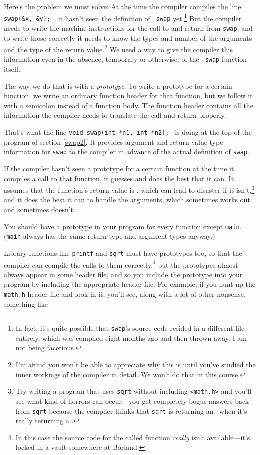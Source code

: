 Here's the problem we must solve: At the time the compiler compiles the
line {\tt swap(\&x, \&y); }, it hasn't seen the definition of {\tt
swap} yet.\footnote{In fact, it's quite possible that {\tt swap}'s
source code resided in a different file entirely, which was compiled
eight months ago and then thrown away.  I am not being facetious.} But
the compiler needs to write the machine instructions for the call to and
return from {\tt swap}, and to write those correctly it needs to know
the types and number of the arguments and the type of the return
value.\footnote{I'm afraid you won't be able to appreciate why this is
until you've studied the inner workings of the compiler in detail.  We
won't do that in this course.} We need a way to give the compiler this
information even in the absence, temporary or otherwise, of the {\tt
swap} function itself.

The way we do that is with a {\em prototype}\/.  To write a prototype
for a certain function, we write an ordinary function header for that
function, but we follow it with a semicolon instead of a function body.
The function header contains all the information the compiler needs to
translate the call and return properly.

That's what the line {\tt void swap(int *n1, int *n2); } is doing at the
top of the program of section \ref{swap2}.  It provides argument and
return value type information for {\tt swap} to the compiler in
advance of the actual definition of {\tt swap}.

If the compiler hasn't seen a prototype for a certain function at the
time it compiles a call to that function, it guesses and does the best
that it can.  It assumes that the function's return value is \int, which
can lead to disaster if it isn't,\footnote{Try writing a program that
uses {\tt sqrt} without including {\tt <math.h>} and you'll see what
kind of horrors can occur---you get completely bogus answers back from
{\tt sqrt} because the compiler thinks that {\tt sqrt} is returning an
\int\ when it's really returning a \double.} and it does the best it can
to handle the arguments, which sometimes works out and sometimes
doesn't.  

You should have a prototype in your program for every function except
{\tt main}.  ({\tt main} always has the same return type and
argument types anyway.)

Library functions like {\tt printf} and {\tt sqrt} must have prototypes
too, so that the compiler can compile the calls to them
correctly,\footnote{In this case the source code for the called function
{\em really}\/ isn't available---it's locked in a vault somewhere at
Borland.} but the prototypes almost always appear in some header file,
and so you include the prototype into your program by including the
appropriate header file.  For example, if you hunt up the {\tt math.h}
header file and look in it, you'll see, along with a lot of other
nonsense, something like

